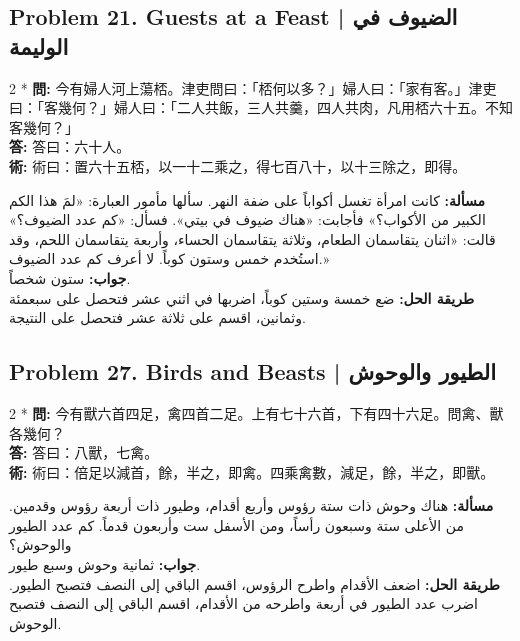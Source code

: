 \documentclass[11pt,a4paper]{article}
\newcommand{\ar}[1]{\arabicfont\beginR #1\endR}
\newcommand{\zh}[1]{{\CJKfamily{}#1}}
\begin{document}
\subsection*{Problem 21. Guests at a Feast | \ar{الضيوف في الوليمة}}

\begin{paracol}{2}
\switchcolumn[0]*\noindent
\textbf{\zh{問}:} \zh{今有婦人河上蕩桮。津吏問曰：「桮何以多？」婦人曰：「家有客。」津吏曰：「客幾何？」婦人曰：「二人共飯，三人共羹，四人共肉，凡用桮六十五。不知客幾何？」}\\
\textbf{\zh{答}:} \zh{答曰：六十人。}\\
\textbf{\zh{術}:} \zh{術曰：置六十五桮，以一十二乘之，得七百八十，以十三除之，即得。}

\switchcolumn
\noindent
\textbf{\ar{مسألة:}} \ar{كانت امرأة تغسل أكواباً على ضفة النهر. سألها مأمور العبارة: «لمَ هذا الكم الكبير من الأكواب؟» فأجابت: «هناك ضيوف في بيتي». فسأل: «كم عدد الضيوف؟» قالت: «اثنان يتقاسمان الطعام، وثلاثة يتقاسمان الحساء، وأربعة يتقاسمان اللحم، وقد استُخدم خمس وستون كوباً. لا أعرف كم عدد الضيوف.»}\\
\textbf{\ar{جواب:}} \ar{ستون شخصاً.}\\
\textbf{\ar{طريقة الحل:}} \ar{ضع خمسة وستين كوباً، اضربها في اثني عشر فتحصل على سبعمئة وثمانين، اقسم على ثلاثة عشر فتحصل على النتيجة.}
\end{paracol}

\subsection*{Problem 27. Birds and Beasts | \ar{الطيور والوحوش}}

\begin{paracol}{2}
\switchcolumn[0]*\noindent
\textbf{\zh{問}:} \zh{今有獸六首四足，禽四首二足。上有七十六首，下有四十六足。問禽、獸各幾何？}\\
\textbf{\zh{答}:} \zh{答曰：八獸，七禽。}\\
\textbf{\zh{術}:} \zh{術曰：倍足以減首，餘，半之，即禽。四乘禽數，減足，餘，半之，即獸。}

\switchcolumn
\noindent
\textbf{\ar{مسألة:}} \ar{هناك وحوش ذات ستة رؤوس وأربع أقدام، وطيور ذات أربعة رؤوس وقدمين. من الأعلى ستة وسبعون رأساً، ومن الأسفل ست وأربعون قدماً. كم عدد الطيور والوحوش؟}\\
\textbf{\ar{جواب:}} \ar{ثمانية وحوش وسبع طيور.}\\
\textbf{\ar{طريقة الحل:}} \ar{اضعف الأقدام واطرح الرؤوس، اقسم الباقي إلى النصف فتصبح الطيور. اضرب عدد الطيور في أربعة واطرحه من الأقدام، اقسم الباقي إلى النصف فتصبح الوحوش.}
\end{paracol}
\end{document}
